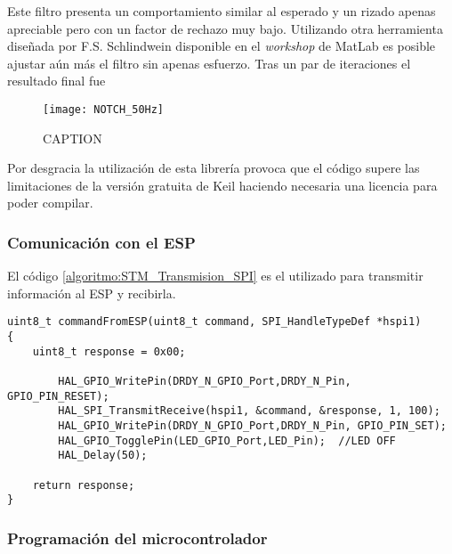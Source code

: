Este filtro presenta un comportamiento similar al esperado y un rizado apenas apreciable pero con un factor de rechazo muy bajo. Utilizando otra herramienta diseñada por F.S. Schlindwein disponible en el \textit{workshop} de MatLab es posible ajustar aún más el filtro sin apenas esfuerzo. Tras un par de iteraciones el resultado final fue

\begin{figure} [H]
    \centering
    \texttt{[image: NOTCH\_50Hz]}
    \caption{CAPTION}
    \label{fig:NOTCH_50Hz}
\end{figure}


Por desgracia la utilización de esta librería provoca que el código supere las limitaciones de la versión gratuita de Keil haciendo necesaria una licencia para poder compilar.

\subsubsection{Comunicación con el ESP \label{sec:Software_micro_ESP}}

El código \ref{algoritmo:STM_Transmision_SPI} es el utilizado para transmitir información al ESP y recibirla.

\begin{lstlisting}[label=algoritmo:STM_Transmision_SPI,style = STM-code,frame=single,caption=Transmisión de datos a través de SPI con el STM]
uint8_t commandFromESP(uint8_t command, SPI_HandleTypeDef *hspi1)
{
	uint8_t response = 0x00;	

		HAL_GPIO_WritePin(DRDY_N_GPIO_Port,DRDY_N_Pin, GPIO_PIN_RESET);
		HAL_SPI_TransmitReceive(hspi1, &command, &response, 1, 100);
		HAL_GPIO_WritePin(DRDY_N_GPIO_Port,DRDY_N_Pin, GPIO_PIN_SET);
		HAL_GPIO_TogglePin(LED_GPIO_Port,LED_Pin); 	//LED OFF
		HAL_Delay(50);
	
	return response;
}
\end{lstlisting}

\subsubsection{Programación del microcontrolador\label{sec:Software_micro_ESP}}

%		
%
